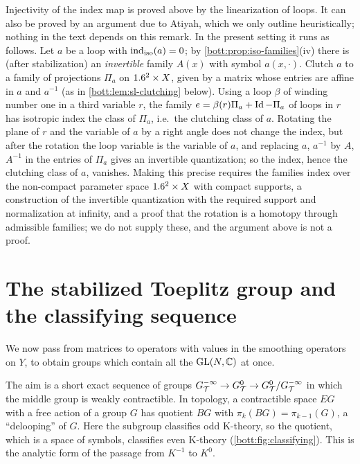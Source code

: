 \begin{remark}\label{bott:rem:rotation-trick}
  Injectivity of the index map is proved above by the linearization of loops. It can also
  be proved by an argument due to Atiyah, which we only outline heuristically; nothing in
  the text depends on this remark. In the present setting it runs as follows. Let $a$ be a
  loop with $\operatorname{ind}_{\mathrm{iso}}(a)=0$; by \cref{bott:prop:iso-families}(iv) there is (after
  stabilization) an \emph{invertible} family $A(x)$ with symbol $a(x,\cdot)$. Clutch $a$
  to a family of projections $\Pi_a$ on $1.6^2\times X$, given by a matrix whose entries
  are affine in $a$ and $a^{-1}$ (as in \cref{bott:lem:sl-clutching} below). Using a
  loop $\beta$ of winding number one in a third variable $r$, the family
  $e=\beta(r)\Pi_a+\operatorname{Id}-\Pi_a$ of loops in $r$ has isotropic index the class of
  $\Pi_a$, i.e.\ the clutching class of $a$. Rotating the plane of $r$ and the variable
  of $a$ by a right angle does not change the index, but after the rotation the loop
  variable is the variable of $a$, and replacing $a$, $a^{-1}$ by $A$, $A^{-1}$ in the
  entries of $\Pi_a$ gives an invertible quantization; so the index, hence the clutching
  class of $a$, vanishes. Making this precise requires the families index over the
  non-compact parameter space $1.6^2\times X$ with compact supports, a construction of the
  invertible quantization with the required support and normalization at infinity, and a
  proof that the rotation is a homotopy through admissible families; we do not supply
  these, and the argument above is not a proof.
\end{remark}

\section[The classifying sequence]{The stabilized Toeplitz group and the classifying sequence}\label{bott:sec:classifying}

We now pass from matrices to operators with values in the smoothing operators on
$Y$, to obtain groups which contain all the $\operatorname{GL}(N,\mathbb{C})$ at once.

The aim is a short exact sequence of groups
$G^{-\infty}_{\mathcal{T}}\to G^{0}_{\mathcal{T}}\to G^{0}_{\mathcal{T}}/G^{-\infty}_{\mathcal{T}}$ in which the middle group is weakly contractible.
In topology, a contractible space $EG$ with a free action of a group $G$ has
quotient $BG$ with $\pi_k(BG)=\pi_{k-1}(G)$, a ``delooping'' of $G$. Here the
subgroup classifies odd K-theory, so the quotient, which is a space of symbols,
classifies even K-theory (\cref{bott:fig:classifying}). This is the analytic
form of the passage from $K^{-1}$ to $K^0$.

